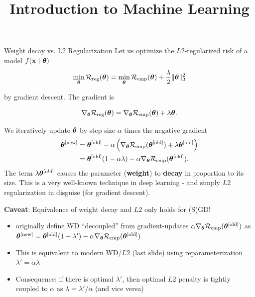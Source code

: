 \documentclass[11pt,compress,t,notes=noshow, xcolor=table]{beamer}
\title{Introduction to Machine Learning}
\date{}
\begin{document}



\begin{vbframe}{Weight decay vs. L2 Regularization}
Let us optimize the $L2$-regularized risk of a model $f(\mathbf{x} ~|~ \bm{\theta})$
\vspace{-0.2cm}
\[
\min_{\bm{\theta}} \mathcal{R}_{\text{reg}}(\bm{\theta}) = \min_{\bm{\theta}} \mathcal{R}_{\text{emp}}(\bm{\theta}) + \frac{\lambda}{2} \|\bm{\theta}\|^2_2
\]

by gradient descent. The gradient is

\[
\nabla_{\bm{\theta}} \mathcal{R}_{\text{reg}}(\bm{\theta}) = \nabla_{\bm{\theta}} \mathcal{R}_{\text{emp}}(\bm{\theta}) + \lambda \bm{\theta}.
\]

We iteratively update $\bm{\theta}$ by step size \(\alpha\) times the
negative gradient
\vspace{-0.2cm}
\begin{align*}
\bm{\theta}^{[\text{new}]} &= \bm{\theta}^{[\text{old}]} - \alpha \left(\nabla_{\bm{\theta}} \mathcal{R}_{\text{emp}}(\bm{\theta}^{[\text{old}]}) + \lambda \bm{\theta}^{[\text{old}]}\right) \\&=
\bm{\theta}^{[\text{old}]} (1 - \alpha \lambda) - \alpha \nabla_{\bm{\theta}} \mathcal{R}_{\text{emp}}(\bm{\theta}^{[\text{old}]}).
\end{align*}
{\small
The term \(\lambda \bm{\theta}^{[old]}\) causes the parameter
(\textbf{weight}) to \textbf{decay} in proportion to its size. This is a very well-known technique in deep learning - and simply $L2$ regularization in disguise (for gradient descent).
}
\framebreak

\textbf{Caveat}: Equivalence of weight decay and $L2$ only holds for (S)GD!

\vspace{0.1cm}

\begin{itemize}\setlength{\itemsep}{0.5em}
    \item {} originally define WD ``decoupled'' from gradient-updates {\footnotesize $\alpha \nabla_{\bm{\theta}} \mathcal{R}_{\text{emp}}(\bm{\theta}^{[\text{old}]})$} as
    {\footnotesize $\bm{\theta}^{[\text{new}]} =
    \bm{\theta}^{[\text{old}]} (1 - \lambda') - \alpha \nabla_{\bm{\theta}} \mathcal{R}_{\text{emp}}(\bm{\theta}^{[\text{old}]})$}
    \item This is equivalent to modern WD/$L2$ (last slide) using reparameterization $\lambda'=\alpha \lambda$
    \item Consequence: if there is optimal $\lambda'$, then optimal $L2$ penalty is tightly coupled to $\alpha$ as $\lambda=\lambda'/ \alpha$ (and vice versa)
    

\end{itemize}
\end{vbframe}
\end{document}
